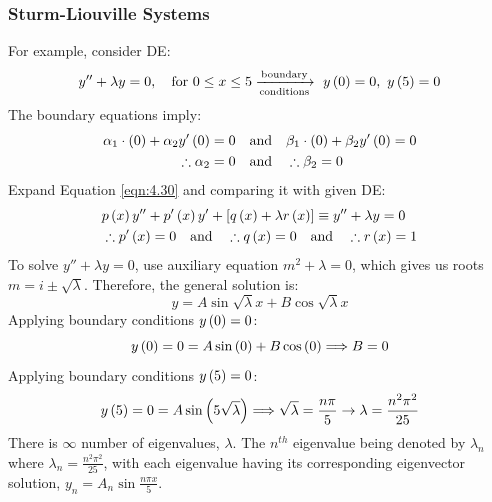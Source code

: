 \subsubsection{Sturm-Liouville Systems}

\noindent For example, consider DE: 
\begin{equation*}
    y''+\lambda y=0,\quad \text{for }0\leq x\leq5\xrightarrow[\text{conditions}]{\text{boundary}}\ y\bracket{0}=0,\ y\bracket{5}=0
\end{equation*}
The boundary equations imply:
\begin{align*}
    \alpha_1\cdot\left(0\right)+\alpha_2y'\left(0\right)=0\quad&\text{and}\quad\beta_1\cdot\left(0\right)+\beta_2y'\left(0\right)=0\\
    \therefore\alpha_2=0\quad&\text{and}\quad\therefore\beta_2=0
\end{align*}
Expand Equation \ref{eqn:4.30} and comparing it with given DE:
\begin{align*}
    &p\left(x\right)y''+p'\left(x\right)y'+\left[q\left(x\right)+\lambda r\left(x\right)\right]\equiv y''+\lambda y=0\\
    &\therefore p'\left(x\right)=0\quad\text{and}\quad\therefore q\left(x\right)=0\quad\text{and}\quad \therefore r\left(x\right)=1
\end{align*}
To solve $y''+\lambda y=0$, use auxiliary equation $m^2+\lambda=0$, which gives us roots $m=i\pm\sqrt{\lambda}$. Therefore, the general solution is:
\begin{equation*}
    y=A\sin\sqrt{\lambda}x+B\cos\sqrt{\lambda}x
\end{equation*}
Applying boundary conditions $y\left(0\right)=0$:
\begin{equation*}
    y\left(0\right)=0=A\sin\left(0\right)+B\cos\left(0\right)\Longrightarrow B=0
\end{equation*}
Applying boundary conditions $y\left(5\right)=0$:
\begin{equation*}
    y\left(5\right)=0=A\sin\left(5\sqrt{\lambda}\right)\Longrightarrow \sqrt{\lambda}=\frac{n\pi}{5}\rightarrow\lambda=\frac{n^2\pi^2}{25}
\end{equation*}
There is $\infty$ number of eigenvalues, $\lambda$. The $n^{th}$ eigenvalue being denoted by $\lambda_n$ where $\displaystyle\lambda_n=\frac{n^2\pi^2}{25}$, with each eigenvalue having its corresponding eigenvector solution, $\displaystyle y_n=A_n\sin\frac{n\pi x}{5}$.
\newpage
